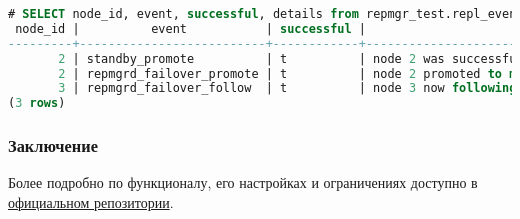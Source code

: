 \begin{lstlisting}[language=SQL,label=lst:repmgr9,caption=Результат после failover]
# SELECT node_id, event, successful, details from repmgr_test.repl_events where event_timestamp>='2016-01-06 18:30';
 node_id |          event           | successful |                         details
---------+--------------------------+------------+----------------------------------------------------------
       2 | standby_promote          | t          | node 2 was successfully promoted to master
       2 | repmgrd_failover_promote | t          | node 2 promoted to master; old master 1 marked as failed
       3 | repmgrd_failover_follow  | t          | node 3 now following new upstream node 2
(3 rows)
\end{lstlisting}

\subsubsection{Заключение}

Более подробно по функционалу, его настройках и ограничениях доступно в \href{https://github.com/2ndQuadrant/repmgr/blob/master/README.md}{официальном репозитории}.

